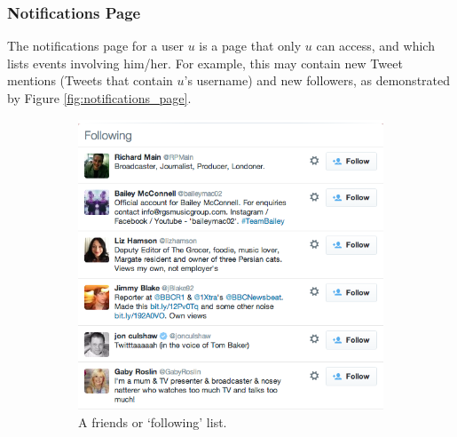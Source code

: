 \subsubsection{Notifications Page}
The notifications page for a user $u$ is a page that only $u$ can access, and which lists events involving him/her. For example, this may contain new Tweet mentions (Tweets that contain $u$'s username) and new followers, as demonstrated by Figure \ref{fig:notifications_page}.

\begin{figure}[h]
    \begin{subfigure}{.5\textwidth}
        \centering
        \includegraphics[scale=0.4]{2.Background/Media/following_list.png} 
        \caption{A friends or `following' list.}
        \label{fig:following_list}
    \end{subfigure}
    \quad
    \begin{subfigure}{.5\textwidth}
         \centering

\end{subfigure}
\end{figure}
